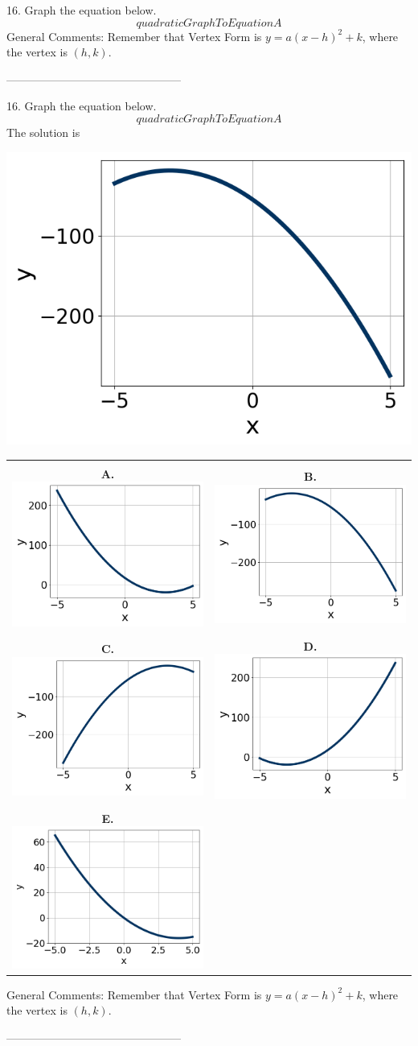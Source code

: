 16. Graph the equation below.
$$ quadraticGraphToEquationA $$ 
General Comments: Remember that Vertex Form is $y = a(x-h)^2+k$, where the vertex is $(h, k)$.

-----------------------------------------------

16. Graph the equation below.
$$ quadraticGraphToEquationA $$ 
The solution is  
 \begin{center} \includegraphics[width=0.5	extwidth]{../Figures/quadraticEquationToGraphBA.png} \end{center}\begin{tabular}{|c|c|} 
\hline 
 & \\ 
\textbf{A.} \includegraphics[width=0.5	extwidth]{../Figures/quadraticEquationToGraphAA.png} & \textbf{B.} \includegraphics[width=0.5	extwidth]{../Figures/quadraticEquationToGraphBA.png} \\ 
\hline 
 & \\ 
\textbf{C.} \includegraphics[width=0.5	extwidth]{../Figures/quadraticEquationToGraphCA.png} & \textbf{D.} \includegraphics[width=0.5	extwidth]{../Figures/quadraticEquationToGraphDA.png} \\ 
\hline 
 & \\ 
 \textbf{E.} \includegraphics[width=0.5	extwidth]{../Figures/quadraticEquationToGraphEA.png} & \\ 
\hline 
 \end{tabular} 
 
General Comments: Remember that Vertex Form is $y = a(x-h)^2+k$, where the vertex is $(h, k)$.

-----------------------------------------------

